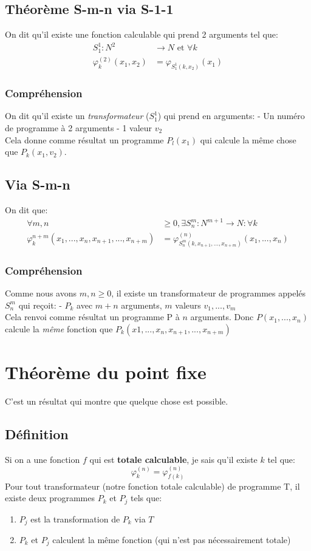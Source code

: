 \documentclass{report}
\begin{document}
\subsection{Théorème S-m-n via S-1-1}
On dit qu'il existe une fonction calculable qui prend 2 arguments tel que:
\begin{align*}
S_1^1 : N^2 &\rightarrow N \text{ et } \forall k\\
\varphi_k^{(2)} (x_1, x_2) &= \varphi_{S_1^1 (k,x_2)} (x_1)
\end{align*}
\subsubsection{Compréhension}
On dit qu'il existe un \textit{transformateur} ($S_1^1$) qui prend en arguments: - Un numéro de programme à 2 arguments - 1 valeur $v_2$\\
Cela donne comme résultat un programme $P_l(x_1)$ qui calcule la même chose que $P_k(x_1,v_2)$.

\subsection{Via S-m-n}
On dit que:
\begin{align*}
\forall m, n &\geq 0, \exists S_n^m : N^{m+1} \rightarrow N : \forall k\\
\varphi_k^{n+m} (x_1, ..., x_n, x_{n+1}, ..., x_{n+m}) &= \varphi_{S_n^m (k, x_{n+1}, ..., x_{n+m})}^{(n)} (x_1, ..., x_n)
\end{align*}
\subsubsection{Compréhension}
Comme nous avons $m,n \geq 0$, il existe un transformateur de programmes appelés $S_n^m$ qui reçoit: - $P_k$ avec $m+n$ arguments, $m$ valeurs $v_1, ..., v_m$\\
Cela renvoi comme résultat un programme P à $n$ arguments. Donc $P(x_1, ..., x_n)$ calcule la \textit{même} fonction que $P_k(x1, ..., x_n, x_{n+1}, ..., x_{n+m})$

\section{Théorème du point fixe}
C'est un résultat qui montre que quelque chose est possible.
\subsection{Définition}
Si on a une fonction $f$ qui est \textbf{totale calculable}, je sais qu'il existe $k$ tel que:
\begin{equation}
\varphi_k^{(n)} = \varphi_{f(k)}^{(n)}
\end{equation}
Pour tout transformateur (notre fonction totale calculable) de programme T, il existe deux programmes $P_k$ et $P_j$ tels que:
\begin{enumerate}
\item $P_j$ est la transformation de $P_k$ via $T$
\item $P_k$ et $P_j$ calculent la même fonction (qui n'est pas nécessairement totale)
\end{enumerate}
\end{document}
